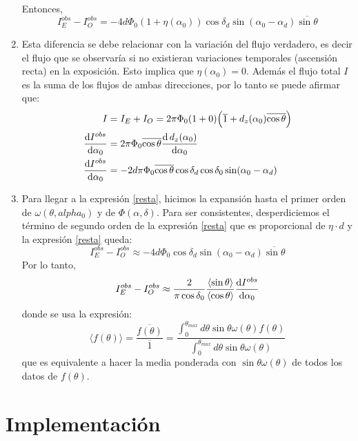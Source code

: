 \begin{enumerate}
     Entonces,
    \begin{equation}
        I^{obs}_E -  I^{obs}_O =-4d \Phi_0 (1+ \eta(\alpha_0)) \cos\delta_d \sin(\alpha_0  - \alpha_d)\overline{\sin\theta}
        \label{resta}
    \end{equation}
    \item Esta diferencia se debe relacionar con la variación del flujo verdadero, es decir el flujo que se observaría si no existieran variaciones temporales (ascensión recta) en la exposición. Esto implica que $\eta(\alpha_0)=0$.  Además el flujo total $I$ es la suma de los flujos de ambas direcciones, por lo tanto se puede afirmar que:
    \begin{align}
        I&=I_E +  I_O = 2\pi\Phi_0 (1+ 0) \Big( \overline{1} + d_z(\alpha_0)\overline{\cos\theta}  \Big)\\
        \dv{I^{obs}}{\alpha_0}  & = 2\pi\Phi_0 \overline{\cos\theta} \dv{\,d_z(\alpha_0) }{\alpha_0}\\ 
        \dv{I^{obs}}{\alpha_0} &= -2d\pi\Phi_0 \overline{\cos\theta}\cos\delta_d \cos\delta_0 \sin(\alpha_0 - \alpha_d) \label{total_flux}
    \end{align}

    \item Para llegar a la expresión \ref{resta}, hicimos la expansión hasta el primer orden de $\omega(\theta, alpha_0)$ y de $\Phi(\alpha, \delta)$. Para ser consistentes, desperdiciemos el término de segundo orden de la expresión \ref{resta} que es proporcional de $\eta \cdot d$ y la expresión \ref{resta} queda:
        \begin{equation}
            I^{obs}_E -  I^{obs}_O \approx -4d \Phi_0 \cos\delta_d \sin(\alpha_0  - \alpha_d)\overline{\sin\theta}
        \end{equation}
    Por lo tanto,
    \begin{equation}
        I^{obs}_E -  I^{obs}_O \approx  \frac{2}{\pi \cos \delta_0} \frac{\langle\sin\theta \rangle}{\langle\cos\theta \rangle}\dv{I^{obs}}{\alpha_0}
        \label{eq:final}
    \end{equation}
    donde se usa la expresión:
    \begin{equation*}
        \langle f(\theta) \rangle = \frac{\overline{f(\theta)}}{\overline{1}} = \displaystyle\frac{\int_{0}^{\theta_{max}} d \theta \sin\theta \omega(\theta) f(\theta) }{\int_{0}^{\theta_{max}} d \theta \sin\theta \omega(\theta)} 
    \end{equation*}
    que es equivalente a hacer la media ponderada con $\sin\theta\omega(\theta)$ de todos los datos de $f(\theta)$.
\end{enumerate}

    \section*{Implementación}



